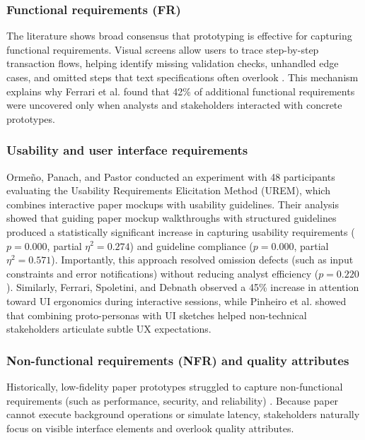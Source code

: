 \subsubsection{Functional requirements (FR)}
The literature shows broad consensus that prototyping is effective for capturing functional requirements. Visual screens allow users to trace step-by-step transaction flows, helping identify missing validation checks, unhandled edge cases, and omitted steps that text specifications often overlook \cite{rueda2020requirements}. This mechanism explains why Ferrari et al. \cite{rej2022evolve} found that 42\% of additional functional requirements were uncovered only when analysts and stakeholders interacted with concrete prototypes.

\subsubsection{Usability and user interface requirements}
Orme{\~n}o, Panach, and Pastor \cite{uv2023empirical} conducted an experiment with 48 participants evaluating the Usability Requirements Elicitation Method (UREM), which combines interactive paper mockups with usability guidelines. Their analysis showed that guiding paper mockup walkthroughs with structured guidelines produced a statistically significant increase in capturing usability requirements ($p = 0.000$, partial $\eta^2 = 0.274$) and guideline compliance ($p = 0.000$, partial $\eta^2 = 0.571$). Importantly, this approach resolved omission defects (such as input constraints and error notifications) without reducing analyst efficiency ($p = 0.220$). Similarly, Ferrari, Spoletini, and Debnath \cite{rej2022evolve} observed a 45\% increase in attention toward UI ergonomics during interactive sessions, while Pinheiro et al. \cite{jserd2019protopersona} showed that combining proto-personas with UI sketches helped non-technical stakeholders articulate subtle UX expectations.

\subsubsection{Non-functional requirements (NFR) and quality attributes}
Historically, low-fidelity paper prototypes struggled to capture non-functional requirements (such as performance, security, and reliability) \cite{rueda2020requirements, davis2018maturity}. Because paper cannot execute background operations or simulate latency, stakeholders naturally focus on visible interface elements and overlook quality attributes.

